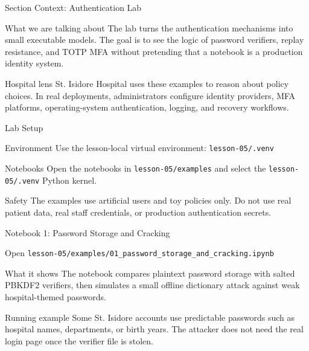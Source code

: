 \documentclass[presentation]{beamer}
\begin{document}
\begin{frame}[c]{Section Context: Authentication Lab}
\begin{block}{What we are talking about}
The lab turns the authentication mechanisms into small executable models. The goal is to see the
logic of password verifiers, replay resistance, and TOTP MFA without pretending that a notebook is a
production identity system.
\end{block}

\begin{exampleblock}{Hospital lens}
St. Isidore Hospital uses these examples to reason about policy choices. In real deployments,
administrators configure identity providers, MFA platforms, operating-system authentication,
logging, and recovery workflows.
\end{exampleblock}
\end{frame}

\begin{frame}[c]{Lab Setup}
\begin{block}{Environment}
Use the lesson-local virtual environment:
\texttt{lesson-05/.venv}
\end{block}

\begin{block}{Notebooks}
Open the notebooks in \texttt{lesson-05/examples} and select the \texttt{lesson-05/.venv} Python
kernel.
\end{block}

\begin{exampleblock}{Safety}
The examples use artificial users and toy policies only. Do not use real patient data, real staff
credentials, or production authentication secrets.
\end{exampleblock}
\end{frame}

\begin{frame}[c]{Notebook 1: Password Storage and Cracking}
\begin{block}{Open}
\texttt{lesson-05/examples/01\_password\_storage\_and\_cracking.ipynb}
\end{block}

\begin{block}{What it shows}
The notebook compares plaintext password storage with salted PBKDF2 verifiers, then simulates a
small offline dictionary attack against weak hospital-themed passwords.
\end{block}

\begin{exampleblock}{Running example}
Some St. Isidore accounts use predictable passwords such as hospital names, departments, or birth
years. The attacker does not need the real login page once the verifier file is stolen.
\end{exampleblock}
\end{frame}
\end{document}
